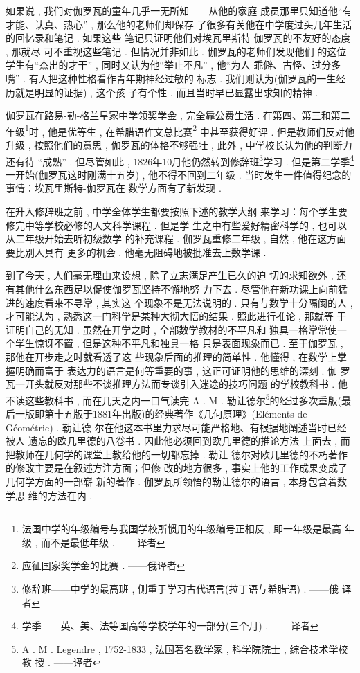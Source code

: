 如果说 , 我们对伽罗瓦的童年几乎一无所知——从他的家庭 成员那里只知道他“有才能、认真、热心” , 那么他的老师们却保存 了很多有关他在中学度过头几年生活的回忆录和笔记 . 如果这些 笔记只证明他们对埃瓦里斯特-伽罗瓦的不友好的态度 , 那就尽 可不重视这些笔记 . 但情况并非如此 . 伽罗瓦的老师们发现他们 的这位学生有“杰出的才干” , 同时又认为他“举止不凡” , 他“为人 乖僻、古怪、过分多嘴” . 有人把这种性格看作青年期神经过敏的 标志 . 我们则认为(伽罗瓦的一生经历就是明显的证据) , 这个孩 子有个性 , 而且当时早已显露出求知的精神 . 

伽罗瓦在路易-勒-格兰皇家中学领奖学金 , 完全靠公费生活 .  在第四、第三和第二年级\footnote{法国中学的年级编号与我国学校所惯用的年级编号正相反 , 即一年级是最高 年级 , 而不是最低年级 . ——译者}时 , 他是优等生 , 在希腊语作文总比赛\footnote{应征国家奖学金的比赛 . ——俄译者} 中甚至获得好评 . 但是教师们反对他升级 , 按照他们的意思 , 伽罗瓦的体格不够强壮 , 此外 , 中学校长认为他的判断力还有待 “成熟” . 但尽管如此 , 1826年10月他仍然转到修辞班\footnote{修辞班——中学的最高班 , 侧重于学习古代语言(拉丁语与希腊语) .  ——俄 译者}学习 .  但是第二学季\footnote{学季——英、美、法等国高等学校学年的一部分(三个月) . ——译者}一开始(伽罗瓦这时刚满十五岁) , 他不得不回到二年级 . 当时发生一件值得纪念的事情：埃瓦里斯特-伽罗瓦在 数学方面有了新发现 . 

在升入修辞班之前 , 中学全体学生都要按照下述的教学大纲 来学习：每个学生要修完中等学校必修的人文科学课程 . 但是学 生之中有些爱好精密科学的 , 也可以从二年级开始去听初级数学 的补充课程 . 伽罗瓦重修二年级 , 自然 , 他在这方面要比别人具有 更多的机会 . 他毫无阻碍地被批准去上数学课 . 

到了今天 , 人们毫无理由来设想 , 除了立志满足产生已久的迫 切的求知欲外 , 还有其他什么东西足以促使伽罗瓦坚持不懈地努 力下去 . 尽管他在新功课上向前猛进的速度看来不寻常 , 其实这 个现象不是无法说明的 . 只有与数学十分隔阂的人 , 才可能认为 ,  熟悉这一门科学是某种大彻大悟的结果 . 照此进行推论 , 那就等 于证明自己的无知 . 虽然在开学之时 , 全部数学教材的不平凡和 独具一格常常使一个学生惊讶不置 , 但是这种不平凡和独具一格 只是表面现象而已 . 至于伽罗瓦 , 那他在开步走之时就看透了这 些现象后面的推理的简单性 . 他懂得 , 在数学上掌握明确而富于 表达力的语言是何等重要的事 , 这正可证明他的思维的深刻 . 伽 罗瓦一开头就反对那些不谈推理方法而专谈引入迷途的技巧问题 的学校教科书 . 他不读这些教科书 , 而在几天之内一口气读完 A .  M . 勒让德尔\footnote{A . M . Legendre , 1752-1833 , 法国著名数学家 , 科学院院士 , 综合技术学校教 授 . ——译者}的经过多次重版(最后一版即第十五版于1881年出版)的经典著作《几何原理》(Eléments de Géométrie) . 勒让德 尔在他这本书里力求尽可能严格地、有根据地阐述当时已经被人 遗忘的欧几里德的八卷书 . 因此他必须回到欧几里德的推论方法 上面去 , 而把教师在几何学的课堂上教给他的一切都忘掉 . 勒让 德尔对欧几里德的不朽著作的修改主要是在叙述方注方面；但修 改的地方很多 , 事实上他的工作成果变成了几何学方面的一部崭 新的著作 . 伽罗瓦所领悟的勒让德尔的语言 , 本身包含着数学思 维的方法在内 . 

